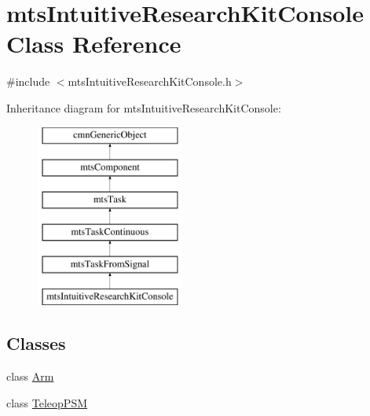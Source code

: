 \hypertarget{classmts_intuitive_research_kit_console}{\section{mts\-Intuitive\-Research\-Kit\-Console Class Reference}
\label{classmts_intuitive_research_kit_console}
}


{\ttfamily \#include $<$mts\-Intuitive\-Research\-Kit\-Console.\-h$>$}

Inheritance diagram for mts\-Intuitive\-Research\-Kit\-Console\-:\begin{figure}[H]
\begin{center}
\leavevmode
\includegraphics[height=6.000000cm]{dc/de3/classmts_intuitive_research_kit_console}
\end{center}
\end{figure}
\subsection*{Classes}
\begin{DoxyCompactItemize}
\item 
class \hyperlink{classmts_intuitive_research_kit_console_1_1_arm}{Arm}
\item 
class \hyperlink{classmts_intuitive_research_kit_console_1_1_teleop_p_s_m}{Teleop\-P\-S\-M}
\end{DoxyCompactItemize}
